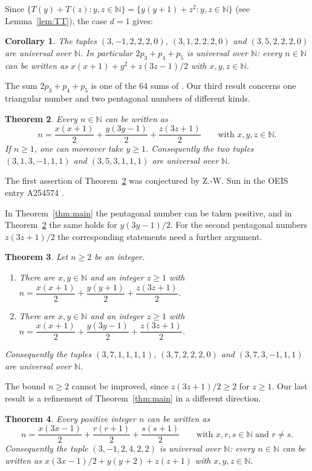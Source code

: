 \documentclass[11pt]{amsart}
\newtheorem{theorem}{Theorem}[section]
\newtheorem{corollary}[theorem]{Corollary}
\theoremstyle{definition}
\theoremstyle{remark}
\newcommand{\N}{\mathbb{N}}
\newcommand{\Tr}{T}
\begin{document}
Since $\{\Tr(y)+\Tr(z):y,z\in\N\}=\{y(y+1)+z^2:y,z\in\N\}$ (see Lemma~\ref{lem:TT}), the case $d=1$ gives:

\begin{corollary}\label{cor:square}
The tuples $(3,-1,2,2,2,0)$, $(3,1,2,2,2,0)$ and $(3,5,2,2,2,0)$ are universal over $\N$.
In particular $2p_3+p_4+p_5$ is universal over $\N$: every $n\in\N$ can be written as
$x(x+1)+y^2+z(3z-1)/2$ with $x,y,z\in\N$.
\end{corollary}

The sum $2p_3+p_4+p_5$ is one of the $64$ sums of \cite[Conjecture~1.13]{S15}.
Our third result concerns one triangular number and two pentagonal numbers of different kinds.

\begin{theorem}\label{thm:mixed}
Every $n\in\N$ can be written as
\[
n=\frac{x(x+1)}{2}+\frac{y(3y-1)}{2}+\frac{z(3z+1)}{2}\qquad\text{with } x,y,z\in\N .
\]
If $n\ge 1$, one can moreover take $y\ge 1$.
Consequently the two tuples $(3,1,3,-1,1,1)$ and $(3,5,3,1,1,1)$ are universal over $\N$.
\end{theorem}

The first assertion of Theorem~\ref{thm:mixed} was conjectured by Z.-W. Sun in the OEIS entry A254574 \cite{OEIS}.

In Theorem~\ref{thm:main} the pentagonal number can be taken positive, and in Theorem~\ref{thm:mixed} the same holds for $y(3y-1)/2$.
For the second pentagonal numbers $z(3z+1)/2$ the corresponding statements need a further argument.

\begin{theorem}\label{thm:shift}
Let $n\ge 2$ be an integer.
\begin{enumerate}
\item[(i)] There are $x,y\in\N$ and an integer $z\ge 1$ with $n=\dfrac{x(x+1)}{2}+\dfrac{y(y+1)}{2}+\dfrac{z(3z+1)}{2}$.
\item[(ii)] There are $x,y\in\N$ and an integer $z\ge 1$ with $n=\dfrac{x(x+1)}{2}+\dfrac{y(3y-1)}{2}+\dfrac{z(3z+1)}{2}$.
\end{enumerate}
Consequently the tuples $(3,7,1,1,1,1)$, $(3,7,2,2,2,0)$ and $(3,7,3,-1,1,1)$ are universal over $\N$.
\end{theorem}

The bound $n\ge 2$ cannot be improved, since $z(3z+1)/2\ge 2$ for $z\ge 1$.
Our last result is a refinement of Theorem~\ref{thm:main} in a different direction.

\begin{theorem}\label{thm:distinct}
Every positive integer $n$ can be written as
\[
n=\frac{x(3x-1)}{2}+\frac{r(r+1)}{2}+\frac{s(s+1)}{2}\qquad\text{with } x,r,s\in\N \text{ and } r\ne s .
\]
Consequently the tuple $(3,-1,2,4,2,2)$ is universal over $\N$: every $n\in\N$ can be written as $x(3x-1)/2+y(y+2)+z(z+1)$ with $x,y,z\in\N$.
\end{theorem}
\end{document}
